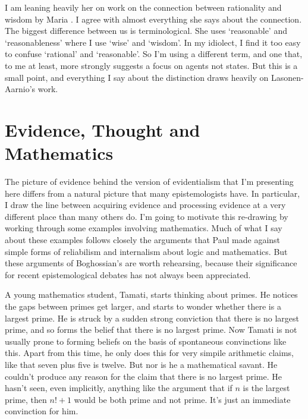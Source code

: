 I am leaning heavily her on work on the connection between rationality and wisdom by Maria \citet{Lasonen-Aarnio2010b, Lasonen-Aarnio2014}. I agree with almost everything she says about the connection. The biggest difference between us is terminological. She uses `reasonable' and `reasonableness' where I use `wise' and `wisdom'. In my idiolect, I find it too easy to confuse `rational' and `reasonable'. So I'm using a different term, and one that, to me at least, more strongly suggests a focus on agents not states. But this is a small point, and everything I say about the distinction draws heavily on Lasonen-Aarnio's work.

\section{Evidence, Thought and Mathematics}
\label{evidencethoughtandmathematics}

The picture of evidence behind the version of evidentialism that I'm presenting here differs from a natural picture that many epistemologists have. In particular, I draw the line between acquiring evidence and processing evidence at a very different place than many others do. I'm going to motivate this re-drawing by working through some examples involving mathematics. Much of what I say about these examples follows closely the arguments that Paul \citet{Boghossian2003} made against simple forms of reliabilism and internalism about logic and mathematics. But these arguments of Boghossian's are worth rehearsing, because their significance for recent epistemological debates has not always been appreciated.

A young mathematics student, \gls{Tamati}, starts thinking about primes. He notices the gaps between primes get larger, and starts to wonder whether there is a largest prime. He is struck by a sudden strong conviction that there is no largest prime, and so forms the belief that there is no largest prime. Now \gls{Tamati} is not usually prone to forming beliefs on the basis of spontaneous convinctions like this. Apart from this time, he only does this for very simpile arithmetic claims, like that seven plus five is twelve. But nor is he a mathematical savant. He couldn't produce any reason for the claim that there is no largest prime. He hasn't seen, even implicitly, anything like the argument that if $n$ is the largest prime, then $n! + 1$ would be both prime and not prime. It's just an immediate convinction for him.

